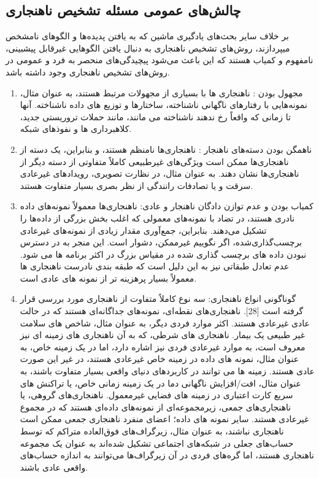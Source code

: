 \documentclass[12pt,a4paper]{report}
\theoremstyle{definition}
\theoremstyle{definition}
\begin{document}
\subsection{چالش‌های عمومی مسئله تشخیص ناهنجاری}
بر خلاف سایر بحث‌های یادگیری ماشین که به یافتن پدیده‌ها و الگوهای نامشخص میپردازند، روش‌های تشخیص ناهنجاری به دنبال یافتن الگوهایی غیرقابل پیشبینی، نامفهوم و کمیاب هستند که این باعث می‌شود پیچیدگی‌های منحصر به فرد و عمومی در روش‌های تشخیص ناهنجاری وجود داشته باشد.
\begin{enumerate}
\item{مجهول بودن
:‌
ناهنجاری ها با بسیاری از مجهولات مرتبط هستند، به عنوان مثال، نمونه‌هایی با رفتارهای ناگهانی ناشناخته، ساختارها و توزیع های داده ناشناخته. آنها تا زمانی که واقعاً رخ ندهند ناشناخته می مانند، مانند حملات تروریستی جدید، کلاهبرداری ها و نفوذهای شبکه.
}
\item
{
ناهمگن بودن دسته‌های ناهنجار 
:
ناهنجاری‌ها نامنظم هستند، و بنابراین، یک دسته از ناهنجاری‌ها ممکن است ویژگی‌های غیرطبیعی کاملاً متفاوتی از دسته دیگر از ناهنجاری‌ها نشان دهند. به عنوان مثال، در نظارت تصویری، رویدادهای غیرعادی سرقت و یا تصادفات رانندگی از نظر بصری بسیار متفاوت هستند.
}

\item{
کمیاب بودن و عدم توازن دادگان ناهنجار و عادی:
ناهنجاری‌ها معمولاً نمونه‌های داده نادری هستند، در تضاد با نمونه‌های معمولی که اغلب بخش بزرگی از داده‌ها را تشکیل می‌دهند. بنابراین، جمع‌آوری مقدار زیادی از نمونه‌های غیرعادی برچسب‌گذاری‌شده، اگر نگوییم غیرممکن، دشوار است. این منجر به در دسترس نبودن داده های برچسب گذاری شده در مقیاس بزرگ در اکثر برنامه ها می شود. عدم تعادل طبقاتی نیز به این دلیل است که طبقه بندی نادرست ناهنجاری ها معمولاً بسیار پرهزینه تر از نمونه های عادی است.
}

\item{
گوناگونی انواع ناهنجاری:
سه نوع کاملاً متفاوت از ناهنجاری مورد بررسی قرار گرفته است [28]. ناهنجاری‌های نقطه‌ای، نمونه‌های جداگانه‌ای هستند که در حالت عادی غیرعادی هستند. اکثر موارد فردی دیگر، به عنوان مثال، شاخص های سلامت غیر طبیعی یک بیمار. ناهنجاری های شرطی، که به آن ناهنجاری های زمینه ای نیز معروف است، به موارد غیرعادی فردی نیز اشاره دارد، اما در یک زمینه خاص، به عنوان مثال، نمونه های داده در زمینه خاص غیرعادی هستند، در غیر این صورت عادی هستند. زمینه ها می توانند در کاربردهای دنیای واقعی بسیار متفاوت باشند، به عنوان مثال، افت/افزایش ناگهانی دما در یک زمینه زمانی خاص، یا تراکنش های سریع کارت اعتباری در زمینه های فضایی غیرمعمول. ناهنجاری‌های گروهی، یا ناهنجاری‌های جمعی، زیرمجموعه‌ای از نمونه‌های داده‌ای هستند که در مجموع غیرعادی هستند. سایر نمونه های داده؛ اعضای منفرد ناهنجاری جمعی ممکن است ناهنجاری نباشند، به عنوان مثال، زیرگراف‌های فوق‌العاده متراکم که توسط حساب‌های جعلی در شبکه‌های اجتماعی تشکیل شده‌اند به عنوان یک مجموعه ناهنجاری هستند، اما گره‌های فردی در آن زیرگراف‌ها می‌توانند به اندازه حساب‌های واقعی عادی باشند.
}
\end{enumerate}
\end{document}
